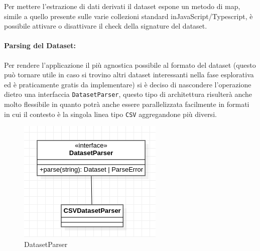 \noindent
Per mettere l'estrazione di dati derivati il dataset espone un metodo di map,
simile a quello presente sulle varie collezioni standard inJavaScript/Typescript,
è possibile attivare o disattivare il check della signature del dataset.

\paragraph{Parsing del Dataset:}
Per rendere l'applicazione il più agnostica possibile al formato del dataset
(questo può tornare utile in caso si trovino altri dataset interessanti nella
fase esplorativa ed è praticamente gratis da implementare) si è deciso di
nascondere l'operazione dietro una interfaccia \texttt{DatasetParser}, questo
tipo di architettura risulterà anche molto flessibile in quanto potrà anche
essere parallelizzata facilmente in formati in cui il contesto è la singola
linea tipo \texttt{CSV} aggregandone più diversi.
\begin{figure}[h!]
  \centering
  \includegraphics[scale=0.55]{../../assets/classi_uml/datasetparser.png}
  \caption{DatasetParser}
\end{figure}

